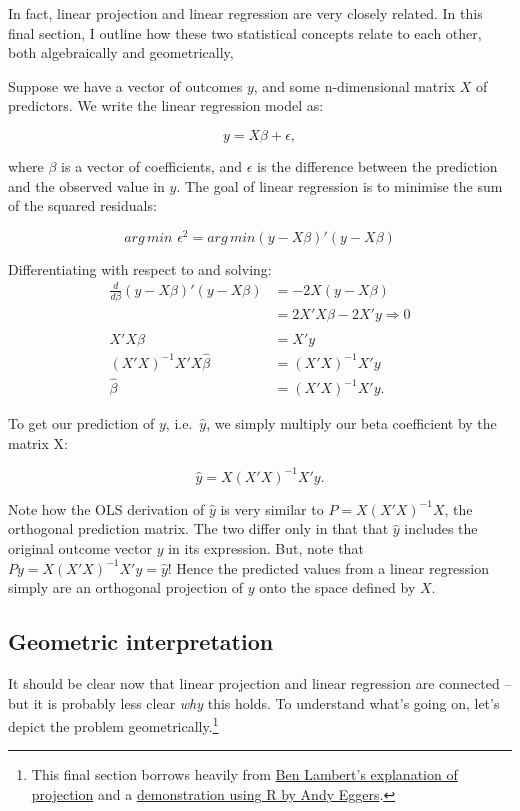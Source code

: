 \documentclass[
]{book}
\begin{document}
In fact, linear projection and linear regression are very closely related. In this final section, I outline how these two statistical concepts relate to each other, both algebraically and geometrically,

Suppose we have a vector of outcomes \(y\), and some n-dimensional matrix \(X\) of predictors. We write the linear regression model as:

\begin{equation}
y = X\beta + \epsilon,
\end{equation}

where \(\beta\) is a vector of coefficients, and \(\epsilon\) is the difference between the prediction and the observed value in \(y\). The goal of linear regression is to minimise the sum of the squared residuals:

\[
arg\,min \,\,  \epsilon^2 = arg\,min (y - X\beta)'(y-X\beta)
\]

Differentiating with respect to \beta and solving:
\[
\begin{aligned}
\frac{d}{d\beta} (y - X\beta)'(y-X\beta) &= -2X(y - X\beta) \\
&= 2X'X\beta -2X'y \Rightarrow 0 \\
X'X\hat{\beta} &= X'y \\
(X'X)^{-1}X'X\hat{\beta} &= (X'X)^{-1}X'y \\
\hat{\beta} &= (X'X)^{-1}X'y.
\end{aligned}
\]

To get our prediction of \(y\), i.e.~\(\hat{y}\), we simply multiply our beta coefficient by the matrix X:

\[
  \hat{y} = X(X'X)^{-1}X'y.
\]

Note how the OLS derivation of \(\hat{y}\) is very similar to \(P = X(X'X)^{-1}X\), the orthogonal prediction matrix. The two differ only in that that \(\hat{y}\) includes the original outcome vector \(y\) in its expression. But, note that \(Py = X(X'X)^{-1}X'y = \hat{y}\)! Hence the predicted values from a linear regression simply are an orthogonal projection of \(y\) onto the space defined by \(X\).

\hypertarget{geometric-interpretation}{%
\subsection{Geometric interpretation}\label{geometric-interpretation}}

It should be clear now that linear projection and linear regression are connected -- but it is probably less clear \emph{why} this holds. To understand what's going on, let's depict the problem geometrically.\footnote{This final section borrows heavily from \href{https://www.youtube.com/watch?v=My51wdv2Uz0}{Ben Lambert's explanation of projection} and a \href{http://andy.egge.rs/teaching/ols_projection.html}{demonstration using R by Andy Eggers}.}
\end{document}

